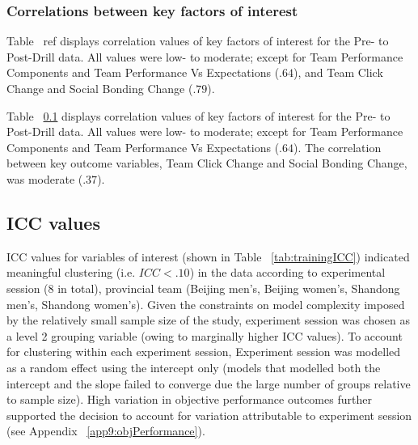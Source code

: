 \subsubsection{Correlations between key factors of interest}
Table ~ref{} displays correlation values of key factors of interest for the Pre- to Post-Drill data.  All values were low- to moderate; except for Team Performance Components and Team Performance Vs Expectations ($.64$), and Team Click Change and Social Bonding Change ($.79$).


Table ~\ref{} displays correlation values of key factors of interest for the Pre- to Post-Drill data.  All values were low- to moderate; except for Team Performance Components and Team Performance Vs Expectations ($.64$).  The correlation between key outcome variables, Team Click Change and Social Bonding Change, was moderate ($.37$).
%



\subsection{ICC values}


%

ICC values for variables of interest (shown in Table ~\ref{tab:trainingICC}) indicated meaningful clustering (i.e. $ICC <.10$) in the data according to experimental session (8 in total), provincial team (Beijing men's, Beijing women's, Shandong men's, Shandong women's).  Given the constraints on model complexity imposed by the relatively small sample size of the study, experiment session was chosen as a level 2 grouping variable (owing to marginally higher ICC values).  To account for clustering within each experiment session, Experiment session was modelled as a random effect using the intercept only (models that modelled both the intercept and the slope failed to converge due the large number of groups relative to sample size).  High variation in objective performance outcomes further supported the decision to account for variation attributable to experiment session (see Appendix ~\ref{app9:objPerformance}).





